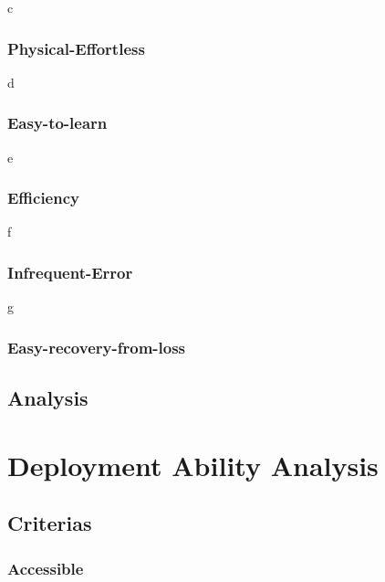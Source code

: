 \begin{CJK}{Bg5}{bsmi}
c

\subsubsection{Physical-Effortless}

d

\subsubsection{Easy-to-learn}

e

\subsubsection{Efficiency}

f

\subsubsection{Infrequent-Error}

g

\subsubsection{Easy-recovery-from-loss}

\subsection{Analysis}

\begin{comment}
The usability can not be neglected when researchers trying to design a system.
Usability is a subjective perception, it may be different from person to person.
The following paragragh states the criterias I used to estimate the usability of a system.
\end{comment}

\section{Deployment Ability Analysis}

\subsection{Criterias}

\subsubsection{Accessible}


\end{CJK}
